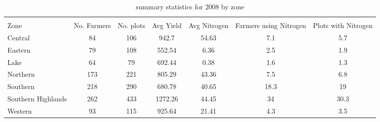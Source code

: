 \documentclass{article}
\begin{document}
\begin{table}
	\caption{summary statistics for 2008 by zone}
	\label{}
\begin{tabular}{@{\extracolsep{5pt}}lcccccc}
\\[-1.8ex]\hline 
\hline \\[-1.8ex]
Zone & \multicolumn{1}{c}{No. Farmers} & \multicolumn{1}{c}{No. plots} & \multicolumn{1}{c}{Avg Yield} & \multicolumn{1}{c}{Avg Nitrogen} & \multicolumn{1}{c}{Farmers using Nitrogen} &\multicolumn{1}{c}{Plots with Nitrogen} \\
\hline
Central & 84 & 106 & 942.7 & 54.63 & 7.1 & 5.7 \\
Eastern & 79 & 108 & 552.54 & 6.36 & 2.5 & 1.9 \\
Lake & 64 & 79 & 692.44 & 0.38 & 1.6 & 1.3 \\
Northern & 173 & 221 & 805.29 & 43.36 & 7.5 & 6.8 \\
Southern & 218 & 290 & 680.78 & 40.65 & 18.3 & 19 \\
Southern Highlands & 262 & 433 & 1272.26 & 44.45 & 34 & 30.3 \\
Western & 93 & 115 & 925.64 & 21.41 & 4.3 & 3.5 \\
\hline
\end{tabular}
\end{table}
\end{document}
